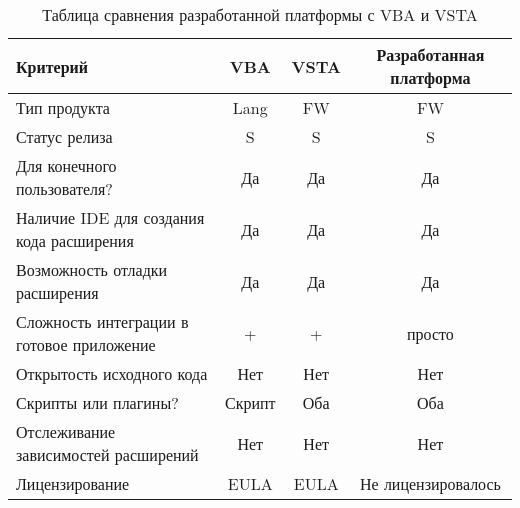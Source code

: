 \begin{table}
  \caption{Таблица сравнения разработанной платформы с VBA и VSTA}
  \label{tabular:res_compare_tab}
  \begin{center}
  \begin{tabular}{|p{4.5cm}|c|c|c|}
  
    \hline
      Критерий &
      VBA &
      VSTA &
      Разработанная платформа \\
    \hline
      Тип продукта &
      Lang &
      FW &
      FW \\
    \hline
      Статус релиза &
      S &
      S &
      S \\
    \hline
      Для конечного пользователя? &
      Да &
      Да &
      Да \\
    \hline
      Наличие IDE для создания кода расширения &
      Да &
      Да &
      Да \\
    \hline
      Возможность отладки расширения &
      Да &
      Да &
      Да \\
    \hline
      Сложность интеграции в готовое приложение &
      + &
      + &
      просто \\
    \hline
      Открытость исходного кода &
      Нет &
      Нет &
      Нет \\
    \hline
      Скрипты или плагины? &
      Скрипт &
      Оба &
      Оба \\
    \hline
      Отслеживание зависимостей расширений &
      Нет &
      Нет &
      Нет \\
    \hline
      Лицензирование &
      EULA &
      EULA &
      Не лицензировалось \\
    \hline
    
  \end{tabular}
  \end{center}
\end{table}